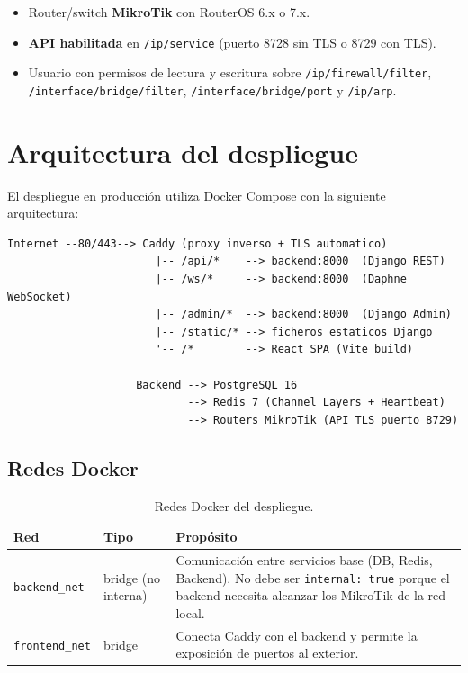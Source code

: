 \documentclass[12pt,a4paper]{article}
\begin{document}
\begin{itemize}
    \item Router/switch \textbf{MikroTik} con RouterOS 6.x o 7.x.
    \item \textbf{API habilitada} en \texttt{/ip/service} (puerto 8728 sin TLS o 8729 con TLS).
    \item Usuario con permisos de lectura y escritura sobre \texttt{/ip/firewall/filter}, \texttt{/interface/bridge/filter}, \texttt{/interface/bridge/port} y \texttt{/ip/arp}.
\end{itemize}

\section{Arquitectura del despliegue}

El despliegue en producción utiliza Docker Compose con la siguiente arquitectura:

\begin{lstlisting}[language={},title={Arquitectura de servicios}]
Internet --80/443--> Caddy (proxy inverso + TLS automatico)
                       |-- /api/*    --> backend:8000  (Django REST)
                       |-- /ws/*     --> backend:8000  (Daphne WebSocket)
                       |-- /admin/*  --> backend:8000  (Django Admin)
                       |-- /static/* --> ficheros estaticos Django
                       '-- /*        --> React SPA (Vite build)

                    Backend --> PostgreSQL 16
                            --> Redis 7 (Channel Layers + Heartbeat)
                            --> Routers MikroTik (API TLS puerto 8729)
\end{lstlisting}

\subsection{Redes Docker}

\begin{table}[H]
\centering
\begin{tabularx}{\textwidth}{llX}
    \toprule
    \textbf{Red} & \textbf{Tipo} & \textbf{Propósito} \\
    \midrule
    \texttt{backend\_net}  & bridge (no interna) & Comunicación entre servicios base (DB, Redis, Backend). No debe ser \texttt{internal: true} porque el backend necesita alcanzar los MikroTik de la red local. \\
    \texttt{frontend\_net} & bridge & Conecta Caddy con el backend y permite la exposición de puertos al exterior. \\
    \bottomrule
\end{tabularx}
\caption{Redes Docker del despliegue.}
\end{table}
\end{document}
